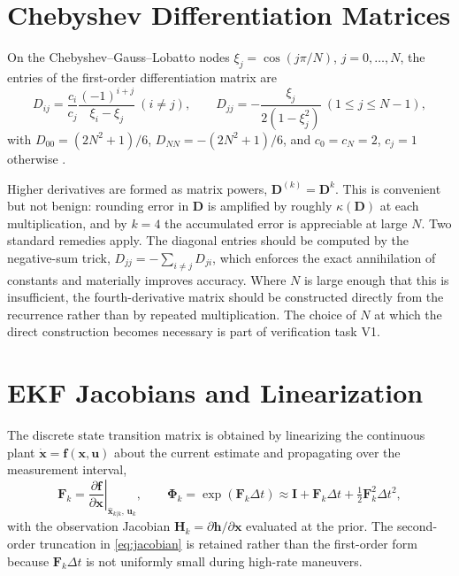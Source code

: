 \documentclass[11pt,a4paper]{article}
\theoremstyle{definition}
\numberwithin{equation}{section}
\begin{document}
\begin{appendices}

\section{Chebyshev Differentiation Matrices}
\label{app:cheb}

On the Chebyshev--Gauss--Lobatto nodes $\xi_j = \cos(j\pi/N)$, $j = 0,\dots,N$, the entries of the first-order differentiation matrix are
\begin{equation}
\label{eq:dmatrix}
D_{ij} = \frac{c_i}{c_j}\frac{(-1)^{i+j}}{\xi_i - \xi_j}\ (i \ne j),
\qquad
D_{jj} = -\frac{\xi_j}{2(1 - \xi_j^2)}\ (1 \le j \le N-1),
\end{equation}
with $D_{00} = (2N^2+1)/6$, $D_{NN} = -(2N^2+1)/6$, and $c_0 = c_N = 2$, $c_j = 1$ otherwise \cite{trefethen2000}.

Higher derivatives are formed as matrix powers, $\mathbf{D}^{(k)} = \mathbf{D}^k$. This is convenient but not benign: rounding error in $\mathbf{D}$ is amplified by roughly $\kappa(\mathbf{D})$ at each multiplication, and by $k = 4$ the accumulated error is appreciable at large $N$. Two standard remedies apply. The diagonal entries should be computed by the negative-sum trick, $D_{jj} = -\sum_{i \ne j} D_{ji}$, which enforces the exact annihilation of constants and materially improves accuracy. Where $N$ is large enough that this is insufficient, the fourth-derivative matrix should be constructed directly from the recurrence rather than by repeated multiplication. The choice of $N$ at which the direct construction becomes necessary is part of verification task V1.

\section{EKF Jacobians and Linearization}
\label{app:ekf}

The discrete state transition matrix is obtained by linearizing the continuous plant $\dot{\mathbf{x}} = \mathbf{f}(\mathbf{x}, \mathbf{u})$ about the current estimate and propagating over the measurement interval,
\begin{equation}
\label{eq:jacobian}
\mathbf{F}_k = \left. \frac{\partial \mathbf{f}}{\partial \mathbf{x}} \right|_{\hat{\mathbf{x}}_{k|k},\, \mathbf{u}_k},
\qquad
\bm{\Phi}_k = \exp\left( \mathbf{F}_k \Delta t \right) \approx \mathbf{I} + \mathbf{F}_k \Delta t + \tfrac{1}{2}\mathbf{F}_k^2 \Delta t^2 ,
\end{equation}
with the observation Jacobian $\mathbf{H}_k = \partial \mathbf{h}/\partial \mathbf{x}$ evaluated at the prior. The second-order truncation in \cref{eq:jacobian} is retained rather than the first-order form because $\mathbf{F}_k \Delta t$ is not uniformly small during high-rate maneuvers.


\end{appendices}
\end{document}
